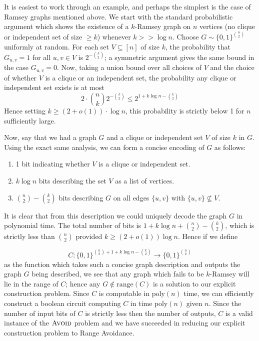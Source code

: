 \documentclass[11pt]{article}
\newcommand{\B}{\{0,1\}}
\newcommand{\poly}{\mathrm{poly}}
\newcommand{\avoid}{\textsc{Avoid}}
\begin{document}
It is easiest to work through an example, and perhaps the simplest is the case of Ramsey graphs mentioned above. We start with the standard probabilistic argument which shows the existence of a $k$-Ramsey graph on $n$ vertices (no clique or independent set of size $\geq  k$) whenever $k >> \log n$. Choose $G \sim \B^{\binom{n}{2}}$ uniformly at random. For each set $V \subseteq [n]$ of size $k$, the probability that $G_{u,v}=1$ for all $u,v \in V$ is $2^{-\binom{k}{2}}$; a symmetric argument gives the same bound in the case $G_{u,v}=0$. Now, taking a union bound over all choices of $V$ and the choice of whether $V$ is a clique or an independent set, the probability any clique or independent set exists is at most
\[
2 \cdot \binom{n}{k} 2^{-\binom{k}{2}} \leq 2^{1+ k \log n-\binom{k}{2}}
\]
Hence setting $k \geq (2+o(1)) \cdot \log n$, this probability is strictly below 1 for $n$ sufficiently large. 

Now, say that we had a graph $G$ and a clique or independent set $V$ of size $k$ in $G$. Using the exact same analysis, we can form a concise encoding of $G$ as follows:

\begin{enumerate}
	\item 1 bit indicating whether $V$ is a clique or independent set.
	\item $k\log n$ bits describing the set $V$ as a list of vertices.
	\item $\binom{n}{2} - \binom{k}{2}$ bits describing $G$ on all edges $\{u,v\}$ with $\{u,v\} \not\subseteq V$.
\end{enumerate}

It is clear that from this description we could uniquely decode the graph $G$ in polynomial time. The total number of bits is $1 + k \log n + \binom{n}{2}- \binom{k}{2} $, which is strictly less than $\binom{n}{2}$ provided $k \geq (2+o(1))\log n$. Hence if we define

\[
C: \B^{\binom{n}{2}  + 1+ k \log n - \binom{k}{2}} \to \B^{\binom{n}{2}}
\]
as the function which takes such a concise graph description and outputs the graph $G$ being described, we see that any graph which fails to be $k$-Ramsey will lie in the range of $C$; hence any $G \notin \mathrm{range}(C)$ is a solution to our explicit construction problem. Since $C$ is computable in $\poly(n)$ time, we can efficiently construct a boolean circuit computing $C$ in time $\poly(n)$ given $n$. Since the number of input bits of $C$ is strictly less then the number of outputs, $C$ is a valid instance of the $\avoid$ problem and we have succeeded in reducing our explicit construction problem to Range Avoidance.
\end{document}
